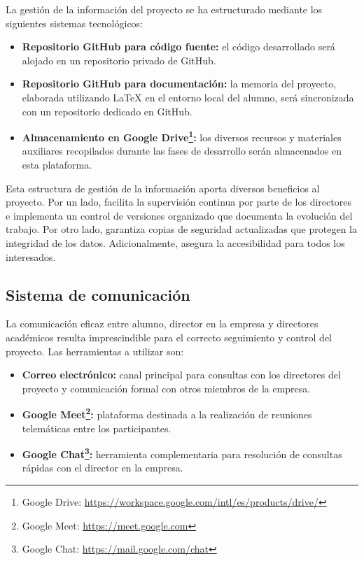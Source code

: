 La gestión de la información del proyecto se ha estructurado mediante los siguientes sistemas tecnológicos:
\begin{itemize}
\item \textbf{Repositorio GitHub para código fuente:} el código desarrollado será alojado en un repositorio privado de GitHub.
\item \textbf{Repositorio GitHub para documentación:} la memoria del proyecto, elaborada utilizando LaTeX en el entorno local del alumno, será sincronizada con un repositorio dedicado en GitHub.
\item \textbf{Almacenamiento en Google Drive\footnote{Google Drive: \url{https://workspace.google.com/intl/es/products/drive/}}:} los diversos recursos y materiales auxiliares recopilados durante las fases de desarrollo serán almacenados en esta plataforma.
\end{itemize}
Esta estructura de gestión de la información aporta diversos beneficios al proyecto. Por un lado, facilita la supervisión continua por parte de los directores e implementa un control de versiones organizado que documenta la evolución del trabajo. Por otro lado, garantiza copias de seguridad actualizadas que protegen la integridad de los datos. Adicionalmente, asegura la accesibilidad para todos los interesados.

\subsection{Sistema de comunicación}
La comunicación eficaz entre alumno, director en la empresa y directores académicos resulta imprescindible para el correcto seguimiento y control del proyecto. Las herramientas a utilizar son:
\begin{itemize}
\item\textbf{Correo electrónico: }canal principal para consultas con los directores del proyecto y comunicación formal con otros miembros de la empresa.
\item\textbf{Google Meet\footnote{Google Meet: \url{https://meet.google.com}}: }plataforma destinada a la realización de reuniones telemáticas entre los participantes.
\item\textbf{Google Chat\footnote{Google Chat: \url{https://mail.google.com/chat}}: }herramienta complementaria para resolución de consultas rápidas con el director en la empresa.
\end{itemize}

